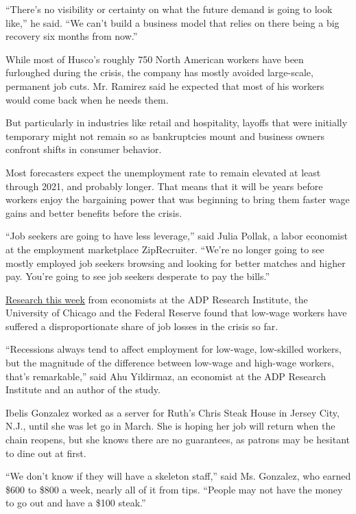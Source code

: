 ``There's no visibility or certainty on what the future demand is going
to look like,'' he said. ``We can't build a business model that relies
on there being a big recovery six months from now.''

While most of Husco's roughly 750 North American workers have been
furloughed during the crisis, the company has mostly avoided
large-scale, permanent job cuts. Mr. Ramirez said he expected that most
of his workers would come back when he needs them.

But particularly in industries like retail and hospitality, layoffs that
were initially temporary might not remain so as bankruptcies mount and
business owners confront shifts in consumer behavior.

Most forecasters expect the unemployment rate to remain elevated at
least through 2021, and probably longer. That means that it will be
years before workers enjoy the bargaining power that was beginning to
bring them faster wage gains and better benefits before the crisis.

``Job seekers are going to have less leverage,'' said Julia Pollak, a
labor economist at the employment marketplace ZipRecruiter. ``We're no
longer going to see mostly employed job seekers browsing and looking for
better matches and higher pay. You're going to see job seekers desperate
to pay the bills.''

\href{https://bfi.uchicago.edu/wp-content/uploads/BFI_WP_202058-1.pdf}{Research
this week} from economists at the ADP Research Institute, the University
of Chicago and the Federal Reserve found that low-wage workers have
suffered a disproportionate share of job losses in the crisis so far.

``Recessions always tend to affect employment for low-wage, low-skilled
workers, but the magnitude of the difference between low-wage and
high-wage workers, that's remarkable,'' said Ahu Yildirmaz, an economist
at the ADP Research Institute and an author of the study.

Ibelis Gonzalez worked as a server for Ruth's Chris Steak House in
Jersey City, N.J., until she was let go in March. She is hoping her job
will return when the chain reopens, but she knows there are no
guarantees, as patrons may be hesitant to dine out at first.

``We don't know if they will have a skeleton staff,'' said Ms. Gonzalez,
who earned \$600 to \$800 a week, nearly all of it from tips. ``People
may not have the money to go out and have a \$100 steak.''

